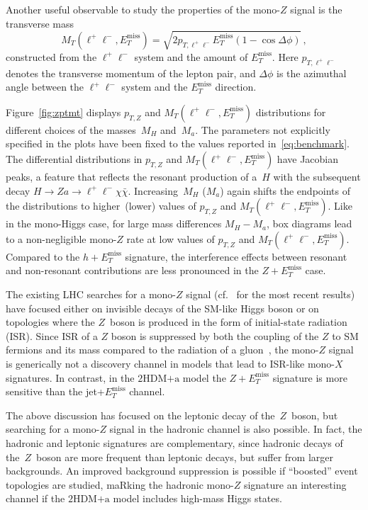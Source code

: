 \documentclass[a4paper, 11pt,notoc]{article}
\newcommand{\MET}{\ensuremath{E_T^\mathrm{miss}}\xspace}
\newcommand{\ma}{\ensuremath{M_{a}}\xspace}
\newcommand{\mH}{\ensuremath{M_{H}}\xspace}
\newcommand{\hdma}{\ensuremath{\textrm{2HDM+a}}\xspace}
\begin{document}
Another useful observable to study the properties of the mono-$Z$ signal is the transverse mass 
\begin{equation} \label{eq:transversemass}
M_T (\ell^+ \ell^-,\MET) = \sqrt{2 p_{T, \ell^+ \ell^-}  \MET  \left ( 1- \cos \Delta \phi \right )} \,,
\end{equation}
constructed from the $\ell^+ \ell^-$ system and the amount of $\MET$. Here $p_{T, \ell^+ \ell^-}$ denotes the transverse momentum of the lepton pair, and $\Delta \phi$ is the azimuthal angle between the $\ell^+ \ell^-$ system and the $\MET$ direction.

Figure~\ref{fig:zptmt} displays  $p_{T,Z}$ and $M_T(\ell^+ \ell^-, \MET)$ distributions for different choices of the masses~$M_H$ and~$M_a$. The parameters not explicitly specified in the plots have been  fixed to the values reported in~\eqref{eq:benchmark}. The differential distributions in $p_{T,Z}$ and $M_T(\ell^+ \ell^-, \MET)$ have Jacobian peaks, a feature that  reflects the resonant production of a~$H$ with the subsequent decay $H \to Z a \to \ell^+ \ell^- \chi \bar \chi$.  Increasing~$\mH$ ($\ma$) again shifts the endpoints of the distributions to higher~(lower) values of $p_{T,Z}$ and $M_T(\ell^+ \ell^-, \MET)$. Like in the mono-Higgs case, for large mass differences $M_H - M_a$, box diagrams lead to a non-negligible mono-$Z$ rate at low values of $p_{T,Z}$ and $M_T(\ell^+ \ell^-, \MET)$. Compared to the $h + \MET$ signature, the interference effects between resonant and non-resonant contributions  are less pronounced  in  the $Z + \MET$  case. 

The existing LHC searches for a mono-$Z$ signal (cf.~\cite{Aaboud:2017bja,Sirunyan:2017qfc} for the most recent results) have focused either on invisible decays of the SM-like Higgs boson or on topologies where the $Z$~boson is produced in the form of initial-state radiation (ISR).  Since ISR of a $Z$ boson is suppressed by both the coupling of the $Z$ to SM fermions and its mass compared to the radiation of a gluon~\cite{Petriello:2008pu,Bell:2012rg,Carpenter:2012rg}, the mono-$Z$ signal is generically not a discovery channel in models that lead to ISR-like mono-$X$ signatures. In contrast, in the \hdma model the $Z+\MET$ signature is more sensitive than the jet+$\MET$ channel.

The above discussion has focused on the leptonic decay of the~$Z$~boson, but searching for a mono-$Z$ signal in the hadronic channel is also possible. In fact, the hadronic and leptonic signatures  are complementary, since hadronic decays of the~$Z$~boson are more frequent than leptonic decays, but suffer from larger backgrounds. An improved background suppression is possible if ``boosted'' event topologies are studied, maRking the hadronic mono-$Z$ signature an interesting channel if the \hdma model includes high-mass Higgs states. 
\end{document}
